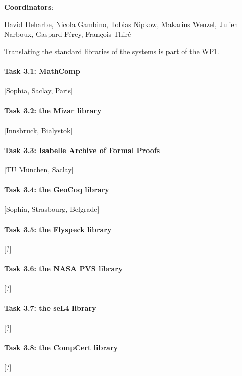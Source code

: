 
{\bf Coordinators}:


David Deharbe, Nicola Gambino, Tobias Nipkow, Makarius Wenzel,
Julien Narboux, Gaspard Férey, François Thiré

Translating the standard libraries of the systems is part of the WP1. 

\paragraph{Task 3.1: MathComp}

 [Sophia, Saclay, Paris]

\paragraph{Task 3.2: the Mizar library}

[Innsbruck, Bialystok]

\paragraph{Task 3.3: Isabelle Archive of Formal Proofs}

[TU München, Saclay]

\paragraph{Task 3.4: the GeoCoq library}

[Sophia, Strasbourg, Belgrade]

\paragraph{Task 3.5: the Flyspeck library} 

[?]

\paragraph{Task 3.6: the NASA PVS library} 

[?]

\paragraph{Task 3.7: the seL4 library}

[?]

\paragraph{Task 3.8: the CompCert library}

[?]
